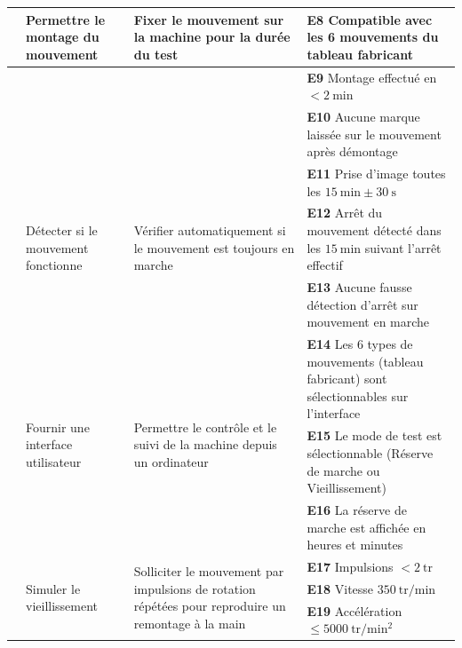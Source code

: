 \begin{landscape}
\begin{longtable}{|>{\raggedright\arraybackslash}p{1cm}|p{4cm}|p{6cm}|p{10.5cm}|}
\multirow{3}{*}{FS3} & \multirow{3}{4cm}{Permettre le montage du mouvement} & \multirow{3}{6cm}{Fixer le mouvement sur la machine pour la durée du test}
    & \rule[-0.4\baselineskip]{0pt}{1.8\baselineskip}\textbf{E8} Compatible avec les 6 mouvements du tableau fabricant \\
\cline{4-4}
 & & & \rule[-0.4\baselineskip]{0pt}{1.8\baselineskip}\textbf{E9} Montage effectué en $< 2\ \mathrm{min}$ \\
\cline{4-4}
 & & & \rule[-0.4\baselineskip]{0pt}{1.8\baselineskip}\textbf{E10} Aucune marque laissée sur le mouvement après démontage \\
\hline

\multirow{3}{*}{FS4} & \multirow{3}{4cm}{Détecter si le mouvement fonctionne} & \multirow{3}{6cm}{Vérifier automatiquement si le mouvement est toujours en marche}
    & \rule[-0.4\baselineskip]{0pt}{1.8\baselineskip}\textbf{E11} Prise d'image toutes les $15\ \mathrm{min} \pm 30\ \mathrm{s}$ \\
\cline{4-4}
 & & & \rule[-0.4\baselineskip]{0pt}{1.8\baselineskip}\textbf{E12} Arrêt du mouvement détecté dans les $15\ \mathrm{min}$ suivant l'arrêt effectif \\
\cline{4-4}
 & & & \rule[-0.4\baselineskip]{0pt}{1.8\baselineskip}\textbf{E13} Aucune fausse détection d'arrêt sur mouvement en marche \\
\hline

\multirow{3}{*}{FS5} & \multirow{3}{4cm}{Fournir une interface utilisateur} & \multirow{3}{6cm}{Permettre le contrôle et le suivi de la machine depuis un ordinateur}
    & \rule[-0.4\baselineskip]{0pt}{1.8\baselineskip}\textbf{E14} Les 6 types de mouvements (tableau fabricant) sont sélectionnables sur l'interface \\
\cline{4-4}
 & & & \rule[-0.4\baselineskip]{0pt}{1.8\baselineskip}\textbf{E15} Le mode de test est sélectionnable (Réserve de marche ou Vieillissement) \\
\cline{4-4}
 & & & \rule[-0.4\baselineskip]{0pt}{1.8\baselineskip}\textbf{E16} La réserve de marche est affichée en heures et minutes \\
\hline

\multirow{3}{*}{FS6} & \multirow{3}{4cm}{Simuler le vieillissement} & \multirow{3}{6cm}{Solliciter le mouvement par impulsions de rotation répétées pour reproduire un remontage à la main}
    & \rule[-0.4\baselineskip]{0pt}{1.8\baselineskip}\textbf{E17} Impulsions $< 2\ \mathrm{tr}$ \\
\cline{4-4}
 & & & \rule[-0.4\baselineskip]{0pt}{1.8\baselineskip}\textbf{E18} Vitesse $350\ \mathrm{tr/min}$ \\
\cline{4-4}
 & & & \rule[-0.4\baselineskip]{0pt}{1.8\baselineskip}\textbf{E19} Accélération $\leq 5000\ \mathrm{tr/min^2}$ \\
\hline


\end{longtable}
\end{landscape}

